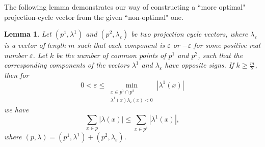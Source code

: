 \documentclass[12p]{article}
\numberwithin{equation}{section}
\newtheorem{lemma}{Lemma}[section]
\begin{document}
The following lemma demonstrates our way of constructing a “more optimal" projection-cycle vector from the given “non-optimal" one.
\begin{lemma} \label{lemma-denominators}
    Let \((p^1,\lambda^1)\) and \((p^2,\lambda_\varepsilon)\) be two projection cycle vectors, where \(\lambda_\varepsilon\) is a vector of length \(m\) such that each component is \(\varepsilon\) or \(-\varepsilon\) for some positive real number \(\varepsilon\). Let \(k\) be the number of common points of \(p^1\) and \(p^2\), such that the corresponding components of the vectors \(\lambda^1\) and \(\lambda_\varepsilon\) have opposite signs. If \(k \ge \frac{m}{2} \), then for
    \[
    0 < \varepsilon \le \min_{\substack{x \in p^1 \cap p^2 \\ \lambda^1(x)\lambda_\varepsilon(x)<0}}|\lambda^1(x)|
    \] we have
    \begin{equation}
        \sum_{x \in p}|\lambda(x)| \le \sum_{x \in p^1}|\lambda^1(x)|,
    \end{equation}
    where \((p,\lambda)=(p^1,\lambda^1)+(p^2,\lambda_\varepsilon)\).
\end{lemma}
\end{document}
